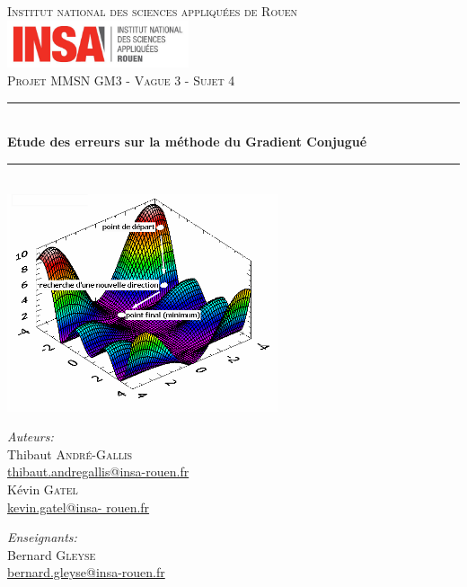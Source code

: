 \documentclass[12,french]{report}
\newcommand{\HRule}{\rule{\linewidth}{0.5mm}}
\begin{document}
\hypersetup{pdfborder=0 0 0}

\begin{titlepage}

\begin{center}
	\textsc{\LARGE Institut national des sciences appliquées de Rouen} 
	\vspace{5mm}\\
	\includegraphics[width=0.4\textwidth]{./Images/insa}\\[1.0 cm]

	\textsc{\Large Projet MMSN GM3 - Vague 3 - Sujet 4}\\[0.6cm]

	\HRule \\[0.5cm]
	{ \Huge \bfseries Etude des erreurs sur la méthode du Gradient Conjugué}\\[0.2cm]
	\HRule \\[0.75cm]

	\includegraphics[width=0.6\textwidth]{./Images/Page_de_garde}\\[0.9 cm]

	\begin{minipage}{0.4\textwidth}
		\begin{flushleft} \large
			\emph{Auteurs:}\\
			Thibaut \textsc{André-Gallis} \\
			{\small\href{mailto:thibaut.andregallis@insa-rouen.fr}{thibaut.andregallis@insa-rouen.fr}} \\
			Kévin \textsc{Gatel} \\
			{\small\href{mailto:kevin.gatel@insa-rouen.fr}{kevin.gatel@insa-				rouen.fr}}
		\end{flushleft}
	\end{minipage}
	\begin{minipage}{0.4\textwidth}
		\begin{flushright} \large
			\emph{Enseignants:} \\
			Bernard \textsc{Gleyse} \\
			{\small\href{mailto:bernard.gleyse@insa-rouen.fr}								{bernard.gleyse@insa-rouen.fr}}\\
		\end{flushright}
	\end{minipage}


\end{center}
\end{titlepage}
\end{document}
